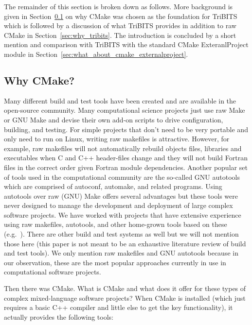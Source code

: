 \documentclass[note]{TechNote}
\begin{document}
The remainder of this section is broken down as follows.  More background is given in Section~\ref{sec:why_cmake} on why CMake was chosen as the foundation for TriBITS which is followed by a discussion of what TriBITS provides in addition to raw CMake in Section~\ref{sec:why_tribits}.  The introduction is concluded by a short mention and comparison with TriBITS with the standard CMake ExteranlProject module in Section~\ref{sec:what_about_cmake_externalproject}.

%
\subsection{Why CMake?}
\label{sec:why_cmake}
%

Many different build and test tools have been created and are available in the open-source community.  Many computational science projects just use raw Make or GNU Make and devise their own add-on scripts to drive configuration, building, and testing.  For simple projects that don't need to be very portable and only need to run on Linux, writing raw makefiles is attractive.  However, for example, raw makefiles will not automatically rebuild objects files, libraries and executables when C and C++ header-files change and they will not build Fortran files in the correct order given Fortran module dependencies.  Another popular set of tools used in the computational community are the so-called GNU autotools which are comprised of autoconf, automake, and related programs.  Using autotools over raw (GNU) Make offers several advantages but these tools were never designed to manage the development and deployment of large complex software projects.  We have worked with projects that have extensive experience using raw makefiles, autotools, and other home-grown tools based on these (e.g.\ \cite{Trilinos}).  There are other build and test systems as well but we will not mention those here (this paper is not meant to be an exhaustive literature review of build and test tools).  We only mention raw makefiles and GNU autotools because in our observation, these are the most popular approaches currently in use in computational software projects.

Then there was CMake.  What is CMake and what does it offer for these types of complex mixed-language software projects?  When CMake is installed (which just requires a basic C++ compiler and little else to get the key functionality), it actually provides the following tools:
\end{document}
